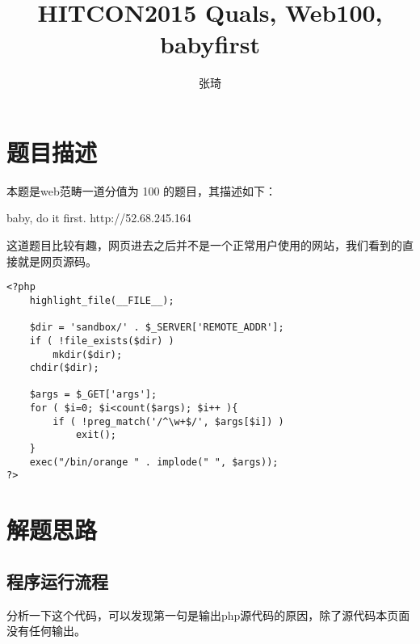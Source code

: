 \documentclass[a4paper,UTF8]{ctexart}
\title{HITCON2015 Quals, Web100, babyfirst}
\author{张琦}
\affil{哈尔滨工业大学，计算机科学与技术学院，peterqi37@hit.edu.cn}
\date{}
\begin{document}
\maketitle



\section{题目描述}

本题是web范畴一道分值为 100 的题目，其描述如下：\\

\begin{quizdesc}[label=Web100 babyfirst]
baby, do it first.
http://52.68.245.164
\end{quizdesc}

这道题目比较有趣，网页进去之后并不是一个正常用户使用的网站，我们看到的直接就是网页源码。

\begin{verbatim}
<?php
    highlight_file(__FILE__);

    $dir = 'sandbox/' . $_SERVER['REMOTE_ADDR'];
    if ( !file_exists($dir) )
        mkdir($dir);
    chdir($dir);

    $args = $_GET['args'];
    for ( $i=0; $i<count($args); $i++ ){
        if ( !preg_match('/^\w+$/', $args[$i]) )
            exit();
    }
    exec("/bin/orange " . implode(" ", $args));
?>
\end{verbatim}

\section{解题思路}

\subsection{程序运行流程}\label{program-workflow}

分析一下这个代码，可以发现第一句是输出php源代码的原因，除了源代码本页面没有任何输出。
\end{document}
